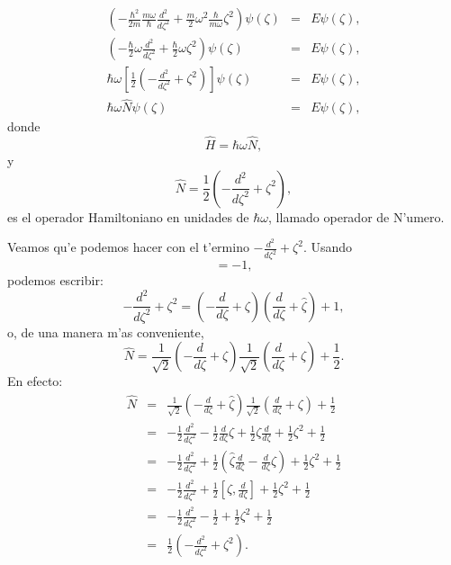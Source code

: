 \begin{eqnarray}
\left( -\frac{\hbar^{2}}{2m}\frac{m\omega}{\hbar}\frac{d^{2}}%
{d\zeta^{2}}+\frac{m}{2}\omega^{2}\frac{\hbar}{m\omega}\zeta^{2}\right)
\psi\left( \zeta\right) & = &E\psi\left( \zeta\right) ,\\
\left( -\frac{\hbar}{2}\omega\frac{d^{2}}{d\zeta^{2}}+\frac{\hbar}%
{2}\omega\zeta^{2}\right) \psi\left( \zeta\right) & = &E\psi\left(
\zeta\right) ,\\
\hbar\omega\left[ \frac{1}{2}\left( -\frac{d^{2}}{d\zeta^{2}}%
+\zeta^{2}\right) \right] \psi\left( \zeta\right) & = &E\psi\left(
\zeta\right) ,\\
\hbar\omega \hat{N}\psi\left( \zeta\right) & = &E\psi\left( \zeta\right) ,
\end{eqnarray}
donde
\begin{equation}
\hat{H}=\hbar\omega\hat{N}\label{H(N)} ,
\end{equation}
y%
\begin{equation}
\hat{N}=\frac{1}{2}\left( -\frac{d^{2}}{d\zeta^{2}}+\zeta%
^{2}\right) \label{N1} ,
\end{equation}
es el operador Hamiltoniano en unidades de $\hbar\omega$, llamado operador de N'umero.

Veamos qu'e podemos hacer con el t'ermino $-\frac{d^{2}}{d\zeta^{2}%
}+\zeta^{2}$. Usando
\begin{equation}
[\zeta,\frac{d}{d\zeta}]  =-1 ,
\end{equation}
podemos escribir:%
\begin{equation}
-\frac{d^{2}}{d\zeta^{2}}+\zeta^{2}=\left( -\frac{d}%
{d\zeta}+\zeta\right) \left( \frac{d}{d\zeta}+\hat{\zeta
}\right) +1 ,
\end{equation}
o, de una manera m'as conveniente,
\begin{equation}
\hat{N}=\frac{1}{\sqrt{2}}\left( -\frac{d}{d\zeta}+\zeta\right)
\frac{1}{\sqrt{2}}\left( \frac{d}{d\zeta}+\zeta\right) +\frac
{1}{2}\label{N2}.
\end{equation}
En efecto:
\begin{eqnarray}
\hat{N} & = &\frac{1}{\sqrt{2}}\left( -\frac{d}{d\zeta}+\hat{\zeta
}\right) \frac{1}{\sqrt{2}}\left( \frac{d}{d\zeta}+\zeta\right)
+\frac{1}{2}\\
& = &-\frac{1}{2}\frac{d^{2}}{d\zeta^{2}}-\frac{1}{2}\frac{d}%
{d\zeta}\zeta+\frac{1}{2}\zeta\frac{d}{d\zeta}+\frac{1}%
{2}\zeta^{2}+\frac{1}{2}\\
& = &-\frac{1}{2}\frac{d^{2}}{d\zeta^{2}}+\frac{1}{2}\left( \hat{\zeta
}\frac{d}{d\zeta}-\frac{d}{d\zeta}\zeta\right) +\frac{1}%
{2}\zeta^{2}+\frac{1}{2}\\
& = &-\frac{1}{2}\frac{d^{2}}{d\zeta^{2}}+\frac{1}{2}[\zeta%
,\frac{d}{d\zeta}]+\frac{1}{2}\zeta^{2}+\frac{1}{2}\\
& = &-\frac{1}{2}\frac{d^{2}}{d\zeta^{2}}-\frac{1}{2}+\frac{1}{2}%
\zeta^{2}+\frac{1}{2}\\
& = &\frac{1}{2}\left( -\frac{d^{2}}{d\zeta^{2}}+\zeta^{2}\right) .
\end{eqnarray}

